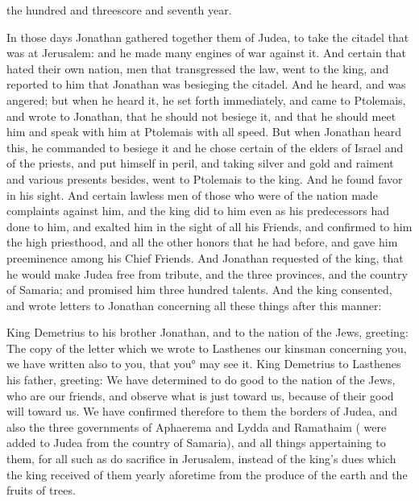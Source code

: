 { the hundred and threescore and seventh year.
\par }{\PP {}In those days Jonathan gathered together them of Judea, to take the citadel that was at Jerusalem: and he made many engines of war against it.
And certain that hated their own nation, men that transgressed the law, went to the king, and reported to him that Jonathan was besieging the citadel.
And he heard, and was angered; but when he heard it, he set forth immediately, and came to Ptolemais, and wrote to Jonathan, that he should not besiege it, and that he should meet him and speak with him at Ptolemais with all speed.
But when Jonathan heard this, he commanded to besiege it
{} and he chose certain of the elders of Israel and of the priests, and put himself in peril,
and taking silver and gold and raiment and various presents besides, went to Ptolemais to the king. And he found favor in his sight.
And certain lawless men of those who were of the nation made complaints against him,
and the king did to him even as his predecessors had done to him, and exalted him in the sight of all his
 Friends,
and confirmed to him the high priesthood, and all the other honors that he had before, and gave him preeminence among his
 Chief Friends.
And Jonathan requested of the king, that he would make Judea free from tribute, and the three
 provinces, and the country of Samaria; and promised him three hundred talents.
And the king consented, and wrote letters to Jonathan concerning all these things after this manner:
\par }{\PP {}King Demetrius to his brother Jonathan, and to the nation of the Jews, greeting:
The copy of the letter which we wrote to Lasthenes our kinsman concerning you, we have written also to you, that you° may see it.
King Demetrius to Lasthenes his father, greeting:
We have determined to do good to the nation of the Jews, who are our friends, and observe what is just toward us, because of their good will toward us.
We have confirmed therefore to them the borders of Judea, and also the three governments of Aphaerema and Lydda and Ramathaim ({} were added to Judea from the country of Samaria), and all things appertaining to them, for all such as do sacrifice in Jerusalem, instead of the king’s dues which the king received of them yearly aforetime from the produce of the earth and the fruits of trees.
}
